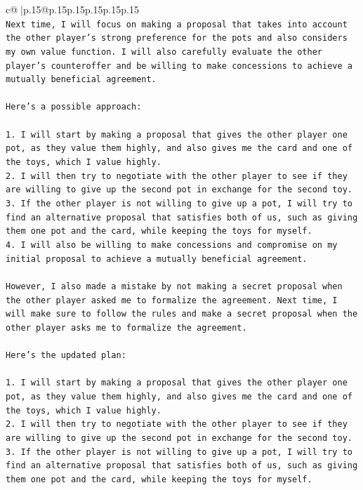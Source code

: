 \documentclass{article}
\begin{document}
{\begin{supertabular}{c@{$\;$}|p{.15\linewidth}@{}p{.15\linewidth}p{.15\linewidth}p{.15\linewidth}p{.15\linewidth}p{.15\linewidth}}
{{{\\ 
\texttt{Next time, I will focus on making a proposal that takes into account the other player's strong preference for the pots and also considers my own value function. I will also carefully evaluate the other player's counteroffer and be willing to make concessions to achieve a mutually beneficial agreement.} \\
\\ 
\texttt{Here's a possible approach:} \\
\\ 
\texttt{1. I will start by making a proposal that gives the other player one pot, as they value them highly, and also gives me the card and one of the toys, which I value highly.} \\
\texttt{2. I will then try to negotiate with the other player to see if they are willing to give up the second pot in exchange for the second toy.} \\
\texttt{3. If the other player is not willing to give up a pot, I will try to find an alternative proposal that satisfies both of us, such as giving them one pot and the card, while keeping the toys for myself.} \\
\texttt{4. I will also be willing to make concessions and compromise on my initial proposal to achieve a mutually beneficial agreement.} \\
\\ 
\texttt{However, I also made a mistake by not making a secret proposal when the other player asked me to formalize the agreement. Next time, I will make sure to follow the rules and make a secret proposal when the other player asks me to formalize the agreement.} \\
\\ 
\texttt{Here's the updated plan:} \\
\\ 
\texttt{1. I will start by making a proposal that gives the other player one pot, as they value them highly, and also gives me the card and one of the toys, which I value highly.} \\
\texttt{2. I will then try to negotiate with the other player to see if they are willing to give up the second pot in exchange for the second toy.} \\
\texttt{3. If the other player is not willing to give up a pot, I will try to find an alternative proposal that satisfies both of us, such as giving them one pot and the card, while keeping the toys for myself.} \\
}}}
\end{supertabular}}
\end{document}
